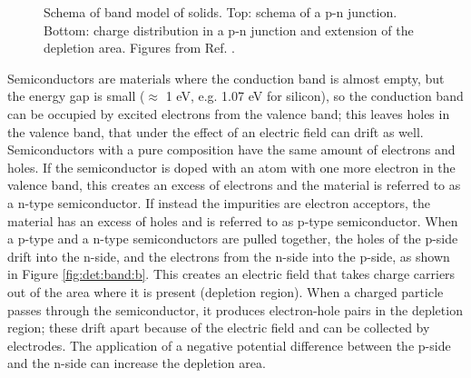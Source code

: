 \begin{figure}[ht]
\centering
{}
\caption{ Schema of band model of solids.  Top: schema of a p-n junction. Bottom: charge distribution in a p-n junction and extension of the depletion area. Figures from Ref. \cite{grupen_shwartz_2008}.}
\label{fig:det:band}
\end{figure}

Semiconductors are materials where the conduction band is almost empty, but the energy gap is small ($\approx$ 1 eV, e.g. 1.07 eV for silicon), so the conduction band can be occupied by excited electrons from the valence band; this leaves holes in the valence band, that under the effect of an electric field can drift as well. Semiconductors with a pure composition have the same amount of electrons and holes. If the semiconductor is doped with an atom with one more electron in the valence band, this creates an excess of electrons and the material is referred to as a n-type semiconductor. If instead the impurities are electron acceptors, the material has an excess of holes and is referred to as p-type semiconductor. When a p-type and a n-type semiconductors are pulled together, the holes of the p-side drift into the n-side, and the electrons from the n-side into the p-side, as shown in Figure \ref{fig:det:band:b}. This creates an electric field that takes charge carriers out of the area where it is present (depletion region). When a charged particle passes through the semiconductor, it produces electron-hole pairs in the depletion region; these drift apart because of the electric field and can be collected by electrodes. The application of a negative potential difference between the p-side and the n-side can increase the depletion area.


